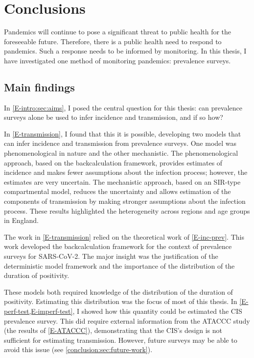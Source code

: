 \documentclass[thesis.tex]{subfiles}
\begin{document}
\ifSubfilesClassLoaded{
    \setcounter{chapter}{7}
}

\chapter{Conclusions} \label{conclusion}

Pandemics will continue to pose a significant threat to public health for the foreseeable future.
Therefore, there is a public health need to respond to pandemics.
Such a response needs to be informed by monitoring.
In this thesis, I have investigated one method of monitoring pandemics: prevalence surveys.

\section{Main findings}

In \cref{E-intro:sec:aims}, I posed the central question for this thesis: can prevalence surveys alone be used to infer incidence and transmission, and if so how?

In \cref{E-transmission}, I found that this it is possible, developing two models that can infer incidence and transmission from prevalence surveys.
One model was phenomenological in nature and the other mechanistic.
The phenomenological approach, based on the backcalculation framework, provides estimates of incidence and makes fewer assumptions about the infection process; however, the estimates are very uncertain.
The mechanistic approach, based on an SIR-type compartmental model, reduces the uncertainty and allows estimation of the components of transmission by making stronger assumptions about the infection process.
These results highlighted the heterogeneity across regions and age groups in England.

The work in \cref{E-transmission} relied on the theoretical work of \cref{E-inc-prev}.
This work developed the backcalculation framework for the context of prevalence surveys for SARS-CoV-2.
The major insight was the justification of the deterministic model framework and the importance of the distribution of the duration of positivity.

These models both required knowledge of the distribution of the duration of positivity.
Estimating this distribution was the focus of most of this thesis.
In \cref{E-perf-test,E-imperf-test}, I showed how this quantity could be estimated the CIS prevalence survey.
This did require external information from the ATACCC study (the results of \cref{E-ATACCC}), demonstrating that the CIS's design is not sufficient for estimating transmission.
However, future surveys may be able to avoid this issue (see \cref{conclusion:sec:future-work}).
\end{document}
